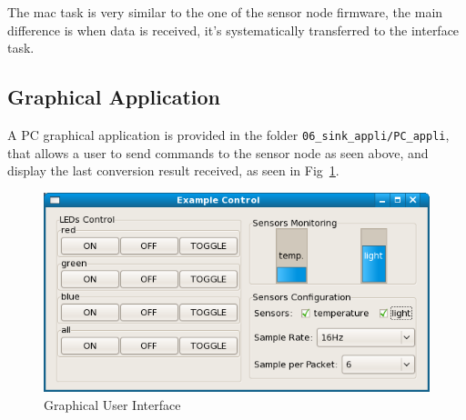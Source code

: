 \documentclass[11pt]{report}
\begin{document}
The mac task is very similar to the one of the sensor node firmware, the main difference is when data is received, it's systematically transferred to the interface task.

\subsection{Graphical Application}
A PC graphical application is provided in the folder \verb$06_sink_appli/PC_appli$, that allows a user to send commands to the sensor node as seen above, and display the last conversion result received, as seen in Fig~\ref{fig:pcappli}.
\begin{figure}[ht]
\begin{center}
\includegraphics[scale=0.5]{figures/PC_appli.png}
\end{center}
\caption{Graphical User Interface}
\label{fig:pcappli}
\end{figure}
\end{document}
